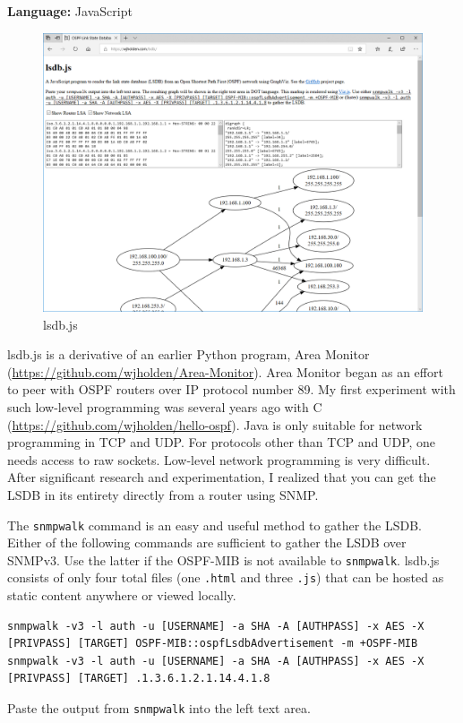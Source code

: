 \documentclass[12pt]{article}
\begin{document}
\noindent \textbf{Language:} JavaScript

\begin{figure}[h]
\centering
\includegraphics[width=.80\textwidth]{lsdb.PNG}
\caption{lsdb.js}
\label{fig:lsdb}
\end{figure}

lsdb.js is a derivative of an earlier Python program, Area Monitor (\url{https://github.com/wjholden/Area-Monitor}). Area Monitor began as an effort to peer with OSPF routers over IP protocol number 89. My first experiment with such low-level programming was several years ago with C (\url{https://github.com/wjholden/hello-ospf}). Java is only suitable for network programming in TCP and UDP. For protocols other than TCP and UDP, one needs access to raw sockets. Low-level network programming is very difficult. After significant research and experimentation, I realized that you can get the LSDB in its entirety directly from a router using SNMP.

The \texttt{snmpwalk} command is an easy and useful method to gather the LSDB. Either of the following commands are sufficient to gather the LSDB over SNMPv3. Use the latter if the OSPF-MIB is not available to \texttt{snmpwalk}. lsdb.js consists of only four total files (one \texttt{.html} and three \texttt{.js}) that can be hosted as static content anywhere or viewed locally.

\begin{lstlisting}
snmpwalk -v3 -l auth -u [USERNAME] -a SHA -A [AUTHPASS] -x AES -X [PRIVPASS] [TARGET] OSPF-MIB::ospfLsdbAdvertisement -m +OSPF-MIB
snmpwalk -v3 -l auth -u [USERNAME] -a SHA -A [AUTHPASS] -x AES -X [PRIVPASS] [TARGET] .1.3.6.1.2.1.14.4.1.8
\end{lstlisting}

Paste the output from \texttt{snmpwalk} into the left text area.
\end{document}
